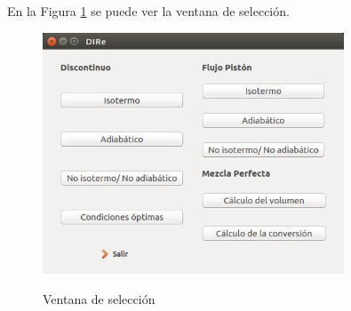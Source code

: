 	En la Figura \ref{vent_seleccion} se puede ver la ventana de selección.
	
	\begin{figure}[!h]
		\centering
		\includegraphics[width=0.8\textwidth]{./imagenes/DIRe_060.png}
		\label{vent_seleccion}
		\caption{Ventana de selección}
	\end{figure}

